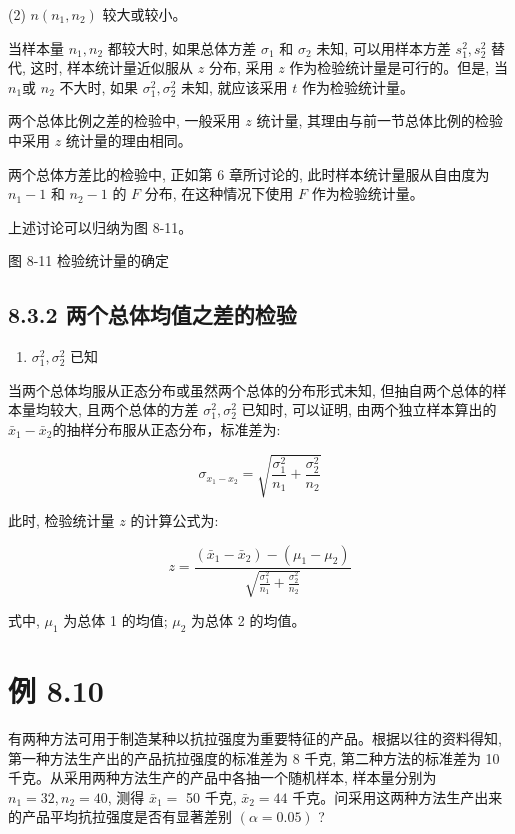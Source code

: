 \documentclass[10pt]{article}
\begin{document}
\begin{CJK*}{UTF8}{bsmi}
(2) $n\left(n_{1}, n_{2}\right)$ 较大或较小。

当样本量 $n_{1}, n_{2}$ 都较大时, 如果总体方差 $\sigma_{1}$ 和 $\sigma_{2}$ 未知, 可以用样本方差 $s_{1}^{2}, s_{2}^{2}$ 替代, 这时, 样本统计量近似服从 $z$ 分布, 采用 $z$ 作为检验统计量是可行的。但是, 当 $n_{1}$或 $n_{2}$ 不大时, 如果 $\sigma_{1}^{2}, \sigma_{2}^{2}$ 未知, 就应该采用 $t$ 作为检验统计量。

两个总体比例之差的检验中, 一般采用 $z$ 统计量, 其理由与前一节总体比例的检验中采用 $z$ 统计量的理由相同。

两个总体方差比的检验中, 正如第 6 章所讨论的, 此时样本统计量服从自由度为 $n_{1}-1$ 和 $n_{2}-1$ 的 $F$ 分布, 在这种情况下使用 $F$ 作为检验统计量。

上述讨论可以归纳为图 8-11。

\begin{center}
\end{center}

图 8-11 检验统计量的确定

\subsection*{8.3.2 两个总体均值之差的检验}
\begin{enumerate}
  \item $\sigma_{1}^{2}, \sigma_{2}^{2}$ 已知
\end{enumerate}

当两个总体均服从正态分布或虽然两个总体的分布形式未知, 但抽自两个总体的样本量均较大, 且两个总体的方差 $\sigma_{1}^{2}, \sigma_{2}^{2}$ 已知时, 可以证明, 由两个独立样本算出的 $\bar{x}_{1}-\bar{x}_{2}$的抽样分布服从正态分布，标准差为:

$$
\sigma_{x_{1}-x_{2}}=\sqrt{\frac{\sigma_{1}^{2}}{n_{1}}+\frac{\sigma_{2}^{2}}{n_{2}}}
$$

此时, 检验统计量 $z$ 的计算公式为:


\begin{equation*}
z=\frac{\left(\bar{x}_{1}-\bar{x}_{2}\right)-\left(\mu_{1}-\mu_{2}\right)}{\sqrt{\frac{\sigma_{1}^{2}}{n_{1}}+\frac{\sigma_{2}^{2}}{n_{2}}}} \tag{8.5}
\end{equation*}


式中, $\mu_{1}$ 为总体 1 的均值; $\mu_{2}$ 为总体 2 的均值。

\section*{例 8.10}
有两种方法可用于制造某种以抗拉强度为重要特征的产品。根据以往的资料得知, 第一种方法生产出的产品抗拉强度的标准差为 8 千克, 第二种方法的标准差为 10 千克。从采用两种方法生产的产品中各抽一个随机样本, 样本量分别为 $n_{1}=32, n_{2}=40$, 测得 $\bar{x}_{1}=$ 50 千克, $\bar{x}_{2}=44$ 千克。问采用这两种方法生产出来的产品平均抗拉强度是否有显著差别 $(\alpha=0.05)$ ?


\end{CJK*}
\end{document}
